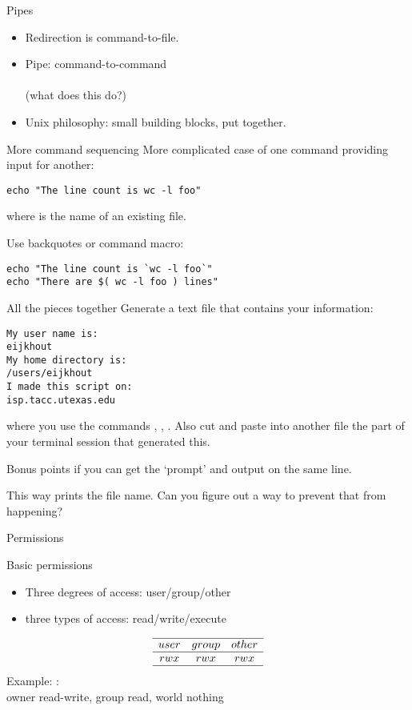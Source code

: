 \documentclass[11pt,headernav]{beamer}
\begin{document}
\begin{numberedframe}{Pipes}
  \label{sl-lnx:pipe}
  \begin{itemize}
  \item Redirection is command-to-file.
  \item Pipe: command-to-command\\
    \\
    (what does this do?)
  \item Unix philosophy: small building blocks, put together.
  \end{itemize}
\end{numberedframe}

\begin{numberedframe}{More command sequencing}
  \label{sl-lnx:backtick}
  More complicated case of one command providing input for another:
\begin{verbatim}
echo "The line count is wc -l foo"
\end{verbatim}
where  is the name of an existing file.

Use backquotes or command macro:
\begin{verbatim}
echo "The line count is `wc -l foo`"
echo "There are $( wc -l foo ) lines"
\end{verbatim}
\end{numberedframe}

\begin{exercise}{All the pieces together}
  Generate a text file that contains your information:
\begin{verbatim}
My user name is:
eijkhout
My home directory is:
/users/eijkhout
I made this script on:
isp.tacc.utexas.edu
\end{verbatim}
where you use the commands , , .
Also cut and paste into another file the part of your terminal session that
generated this.

Bonus points if you can get the `prompt' and output on the same line.
\end{exercise}

\begin{exercise}{}
  This way  prints the file name.
  Can you figure out a way to prevent that from happening?
\end{exercise}

 {Permissions}

\begin{numberedframe}{Basic permissions}
  \label{sl-lnx:rwx}
  \begin{itemize}
  \item Three degrees of access: user/group/other
  \item three types of access: read/write/execute
  \end{itemize}
  \[ \begin{array}{ccc}
    \hline user&group&other\\ \hline rwx&rwx&rwx \\ \hline
  \end{array}
  \]
  Example: :\\
  owner read-write, group read, world nothing
\end{numberedframe}
\end{document}

